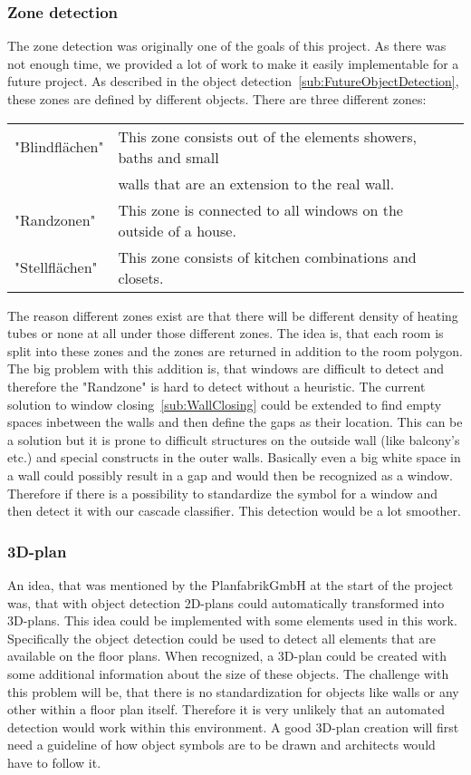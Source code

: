 \subsubsection{Zone detection}
\label{sub:ZoneDetection}
The zone detection was originally one of the goals of this project. As there was not enough time, we provided a lot of work to make it easily implementable for a future project. As described in the object detection~\ref{sub:FutureObjectDetection}, these zones are defined by different objects.
There are three different zones:
\begin{table}[H]
	\centering
	\label{tab:Zones}
	\begin{tabular}{@{}lll@{}}
		"Blindflächen" & This zone consists out of the elements showers, baths and small \\
		& walls that are an extension to the real wall.\\
		"Randzonen" &  This zone is connected to all windows on the outside of a house. \\
		"Stellflächen" & This zone consists of kitchen combinations and closets.\\
	\end{tabular}
\end{table}	

The reason different zones exist are that there will be different density of heating tubes or none at all under those different zones. The idea is, that each room is split into these zones and the zones are returned in addition to the room polygon. The big problem with this addition is, that windows are difficult to detect and therefore the "Randzone" is hard to detect without a heuristic. The current solution to window closing~\ref{sub:WallClosing} could be extended to find empty spaces inbetween the walls and then define the gaps as their location. This can be a solution but it is prone to difficult structures on the outside wall (like balcony's etc.) and special constructs in the outer walls. Basically even a big white space in a wall could possibly result in a gap and would then be recognized as a window. Therefore if there is a possibility to standardize the symbol for a window and then detect it with our cascade classifier. This detection would be a lot smoother.

\subsubsection{3D-plan}
An idea, that was mentioned by the PlanfabrikGmbH at the start of the project was, that with object detection 2D-plans could automatically transformed into 3D-plans. This idea could be implemented with some elements used in this work. Specifically the object detection could be used to detect all elements that are available on the floor plans. When recognized, a 3D-plan could be created with some additional information about the size of these objects. The challenge with this problem will be, that there is no standardization for objects like walls or any other within a floor plan itself. Therefore it is very unlikely that an automated detection would work within this environment. A good 3D-plan creation will first need a guideline of how object symbols are to be drawn and architects would have to follow it.


